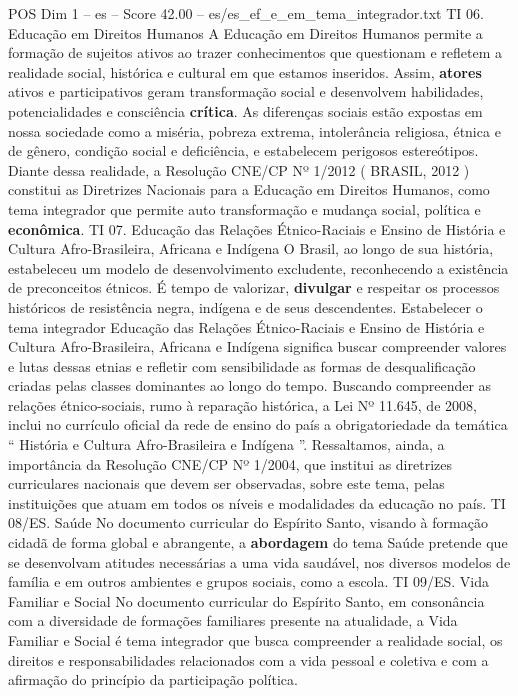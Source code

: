 \begin{textsample}{POS Dim 1 – es – Score 42.00 – es/es\_ef\_e\_em\_tema\_integrador.txt}
TI 06.
Educação em Direitos Humanos A Educação em Direitos Humanos permite a formação de sujeitos ativos ao trazer conhecimentos que questionam e refletem a realidade social, histórica e cultural em que estamos inseridos.
Assim, \textbf{atores} ativos e participativos geram transformação social e desenvolvem habilidades, potencialidades e consciência \textbf{crítica}.
As diferenças sociais estão expostas em nossa sociedade como a miséria, pobreza extrema, intolerância religiosa, étnica e de gênero, condição social e deficiência, e estabelecem perigosos estereótipos.
Diante dessa realidade, a Resolução CNE/CP Nº 1/2012 ( BRASIL, 2012 ) constitui as Diretrizes Nacionais para a Educação em Direitos Humanos, como tema integrador que permite auto transformação e mudança social, política e \textbf{econômica}.
TI 07.
Educação das Relações Étnico-Raciais e Ensino de História e Cultura Afro-Brasileira, Africana e Indígena O Brasil, ao longo de sua história, estabeleceu um modelo de desenvolvimento excludente, reconhecendo a existência de preconceitos étnicos.
É tempo de valorizar, \textbf{divulgar} e respeitar os processos históricos de resistência negra, indígena e de seus descendentes.
Estabelecer o tema integrador Educação das Relações Étnico-Raciais e Ensino de História e Cultura Afro-Brasileira, Africana e Indígena significa buscar compreender valores e lutas dessas etnias e refletir com sensibilidade as formas de desqualificação criadas pelas classes dominantes ao longo do tempo.
Buscando compreender as relações étnico-sociais, rumo à reparação histórica, a Lei Nº 11.645, de 2008, inclui no currículo oficial da rede de ensino do país a obrigatoriedade da temática “ História e Cultura Afro-Brasileira e Indígena ”.
Ressaltamos, ainda, a importância da Resolução CNE/CP Nº 1/2004, que institui as diretrizes curriculares nacionais que devem ser observadas, sobre este tema, pelas instituições que atuam em todos os níveis e modalidades da educação no país.
TI 08/ES.
Saúde No documento curricular do Espírito Santo, visando à formação cidadã de forma global e abrangente, a \textbf{abordagem} do tema Saúde pretende que se desenvolvam atitudes necessárias a uma vida saudável, nos diversos modelos de família e em outros ambientes e grupos sociais, como a escola.
TI 09/ES.
Vida Familiar e Social No documento curricular do Espírito Santo, em consonância com a diversidade de formações familiares presente na atualidade, a Vida Familiar e Social é tema integrador que busca compreender a realidade social, os direitos e responsabilidades relacionados com a vida pessoal e coletiva e com a afirmação do princípio da participação política.

\end{textsample}
